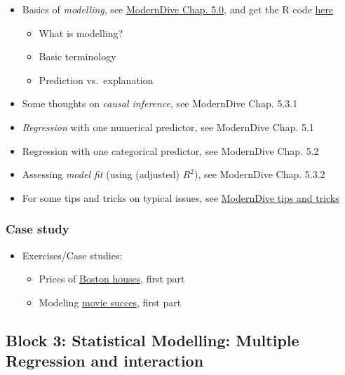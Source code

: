 \documentclass[
  letterpaper,
  DIV=11,
  numbers=noendperiod]{scrreprt}
\providecommand{\tightlist}{%
  \setlength{\itemsep}{0pt}\setlength{\parskip}{0pt}}\usepackage{longtable,booktabs,array}
\theoremstyle{definition}
\theoremstyle{definition}
\theoremstyle{remark}
\begin{document}
\begin{itemize}
\item
  Basics of \emph{modelling}, see
  \href{https://moderndive.com/5-regression.html}{ModernDive Chap. 5.0},
  and get the R code
  \href{http://moderndive.com/scripts/05-regression.R}{here}

  \begin{itemize}
  \tightlist
  \item
    What is modelling?
  \item
    Basic terminology
  \item
    Prediction vs.~explanation
  \end{itemize}
\item
  Some thoughts on \emph{causal inference}, see ModernDive Chap. 5.3.1
\item
  \emph{Regression} with one numerical predictor, see ModernDive Chap.
  5.1
\item
  Regression with one categorical predictor, see ModernDive Chap. 5.2
\item
  Assessing \emph{model fit} (using (adjusted) \(R^2\)), see ModernDive
  Chap. 5.3.2
\item
  For some tips and tricks on typical issues, see
  \href{https://moderndive.github.io/moderndive_labs/tips_and_tricks.html}{ModernDive
  tips and tricks}
\end{itemize}

\hypertarget{case-study}{%
\subsubsection*{Case study}\label{case-study}}

\begin{itemize}
\tightlist
\item
  Exercises/Case studies:

  \begin{itemize}
  \tightlist
  \item
    Prices of
    \href{https://moderndive.com/11-thinking-with-data.html\#seattle-house-prices}{Boston
    houses}, first part
  \item
    Modeling
    \href{https://data-se.netlify.app/2021/02/24/modelling-movie-successes-linear-regression/}{movie
    succes}, first part
  \end{itemize}
\end{itemize}

\hypertarget{block-3-statistical-modelling-multiple-regression-and-interaction}{%
\subsection*{Block 3: Statistical Modelling: Multiple Regression and
interaction}\label{block-3-statistical-modelling-multiple-regression-and-interaction}}
\end{document}
